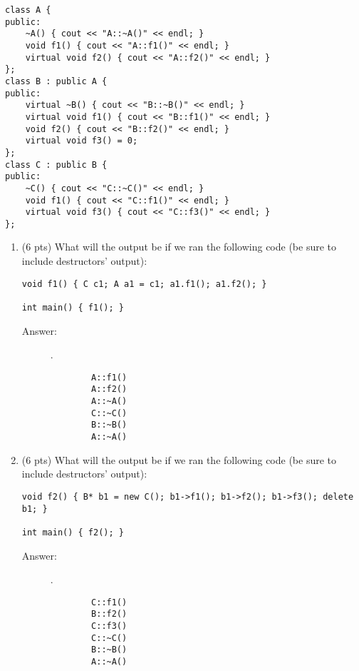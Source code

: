 \documentclass[11pt]{article}
\begin{document}
\begin{verbatim}
class A {
public:
    ~A() { cout << "A::~A()" << endl; }
    void f1() { cout << "A::f1()" << endl; }
    virtual void f2() { cout << "A::f2()" << endl; }
};
class B : public A {
public:
    virtual ~B() { cout << "B::~B()" << endl; }
    virtual void f1() { cout << "B::f1()" << endl; }
    void f2() { cout << "B::f2()" << endl; }
    virtual void f3() = 0;
};
class C : public B {
public:
    ~C() { cout << "C::~C()" << endl; }
    void f1() { cout << "C::f1()" << endl; }
    virtual void f3() { cout << "C::f3()" << endl; }
};
\end{verbatim}

\begin{enumerate}
\item (6 pts) What will the output be if we ran the following code (be sure to
include destructors' output):

\begin{verbatim}
void f1() { C c1; A a1 = c1; a1.f1(); a1.f2(); }

int main() { f1(); }
\end{verbatim}

\begin{description}
    \item[Answer:] .\\
    \begin{verbatim}
        A::f1()
        A::f2()
        A::~A()
        C::~C()
        B::~B()
        A::~A()
    \end{verbatim}
\end{description}

\item (6 pts) What will the output be if we ran the following code (be sure to
include destructors' output):

\begin{verbatim}
void f2() { B* b1 = new C(); b1->f1(); b1->f2(); b1->f3(); delete b1; }

int main() { f2(); }
\end{verbatim}

\begin{description}
    \item[Answer:] .\\
    \begin{verbatim}
        C::f1()
        B::f2()
        C::f3()
        C::~C()
        B::~B()
        A::~A()
    \end{verbatim}
\end{description}
\end{enumerate}
\end{document}
